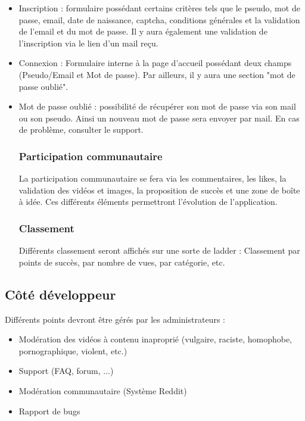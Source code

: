 \documentclass[a4paper,10pt]{article}
\begin{document}
\begin{itemize}
\item Inscription : formulaire possédant certains critères tels que le pseudo, mot de passe, email, date de naissance, captcha, conditions générales et la validation de l'email et du mot de passe. Il y aura également une validation de l'inscription via le lien d'un mail reçu.
\item Connexion : Formulaire interne à la page d'accueil possédant deux champs (Pseudo/Email et Mot de passe). Par ailleurs, il y aura une section "mot de passe oublié".
\item Mot de passe oublié : possibilité de récupérer son mot de passe via son mail ou son pseudo. Ainsi un nouveau mot de passe sera envoyer par mail. En cas de problème, consulter le support.

\subsubsection{Participation communautaire}

La participation communautaire se fera via les commentaires, les likes, la validation des vidéos et images, la proposition de succès et une zone de boîte à idée. Ces différents éléments permettront l'évolution de l'application. 

\subsubsection{Classement}

Différents classement seront affichés sur une sorte de ladder : Classement par points de succès, par nombre de vues, par catégorie, etc.

\end{itemize}

\subsection{Côté développeur}

Différents points devront être gérés par les administrateurs :
\begin{itemize}
\item Modération des vidéos à contenu inaproprié (vulgaire, raciste, homophobe, pornographique, violent, etc.)
\item Support (FAQ, forum, ...)
\item Modération communautaire (Système Reddit)
\item Rapport de bugs
\end{itemize}
\end{document}
